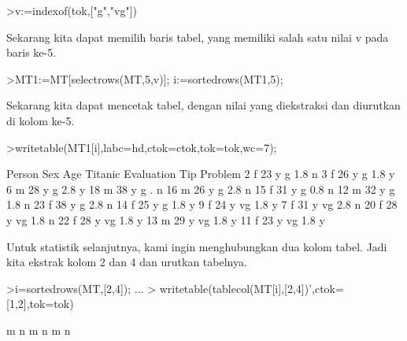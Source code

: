 \documentclass{article}
\begin{document}
\begin{eulernotebook}
\begin{eulercomment}
\begin{eulercomment}
\begin{eulerprompt}
>v:=indexof(tok,["g","vg"])
\end{eulerprompt}
\begin{euleroutput}
  [5,  6]
\end{euleroutput}
\begin{eulercomment}
Sekarang kita dapat memilih baris tabel, yang memiliki salah satu
nilai v pada baris ke-5.
\end{eulercomment}
\begin{eulerprompt}
>MT1:=MT[selectrows(MT,5,v)]; i:=sortedrows(MT1,5);
\end{eulerprompt}
\begin{eulercomment}
Sekarang kita dapat mencetak tabel, dengan nilai yang diekstraksi dan
diurutkan di kolom ke-5.
\end{eulercomment}
\begin{eulerprompt}
>writetable(MT1[i],labc=hd,ctok=ctok,tok=tok,wc=7);
\end{eulerprompt}
\begin{euleroutput}
   Person    Sex    Age Titanic Evaluation    Tip Problem
        2      f     23       y          g    1.8       n
        3      f     26       y          g    1.8       y
        6      m     28       y          g    2.8       y
       18      m     38       y          g      .       n
       16      m     26       y          g    2.8       n
       15      f     31       y          g    0.8       n
       12      m     32       y          g    1.8       n
       23      f     38       y          g    2.8       n
       14      f     25       y          g    1.8       y
        9      f     24       y         vg    1.8       y
        7      f     31       y         vg    2.8       n
       20      f     28       y         vg    1.8       n
       22      f     28       y         vg    1.8       y
       13      m     29       y         vg    1.8       y
       11      f     23       y         vg    1.8       y
\end{euleroutput}
\begin{eulercomment}
Untuk statistik selanjutnya, kami ingin menghubungkan dua kolom tabel.
Jadi kita ekstrak kolom 2 dan 4 dan urutkan tabelnya.
\end{eulercomment}
\begin{eulerprompt}
>i=sortedrows(MT,[2,4]);  ...
>  writetable(tablecol(MT[i],[2,4])',ctok=[1,2],tok=tok)
\end{eulerprompt}
\begin{euleroutput}
           m         n
           m         n
           m         n

\end{euleroutput}
\end{eulercomment}
\end{eulercomment}
\end{eulernotebook}
\end{document}
